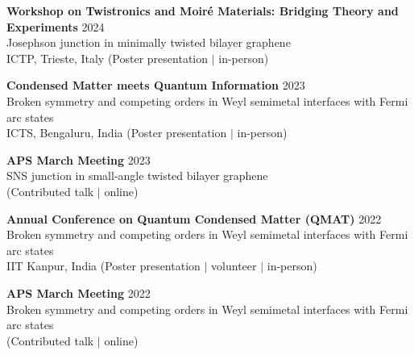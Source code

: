 \documentclass[a4paper,11pt]{article}
\begin{document}
\noindent
\textbf{Workshop on Twistronics and Moiré Materials: Bridging Theory and Experiments} \hfill 2024\\
Josephson junction in minimally twisted bilayer graphene \\
ICTP, Trieste, Italy (Poster presentation $\vert$ in-person)

\noindent
\textbf{Condensed Matter meets Quantum Information} \hfill 2023 \\
Broken symmetry and competing orders in Weyl semimetal interfaces with Fermi arc states \\
ICTS, Bengaluru, India (Poster presentation $\vert$ in-person)

\noindent
\textbf{APS March Meeting} \hfill 2023\\
SNS junction in small-angle twisted bilayer graphene \\
(Contributed talk $\vert$ online)

\noindent
\textbf{Annual Conference on Quantum Condensed Matter (QMAT)} \hfill 2022 \\
Broken symmetry and competing orders in Weyl semimetal interfaces with Fermi arc states\\
IIT Kanpur, India (Poster presentation $\vert$ volunteer $\vert$ in-person)

\noindent
\textbf{APS March Meeting} \hfill 2022\\
Broken symmetry and competing orders in Weyl semimetal interfaces with Fermi arc states \\
(Contributed talk $\vert$ online)
\end{document}
